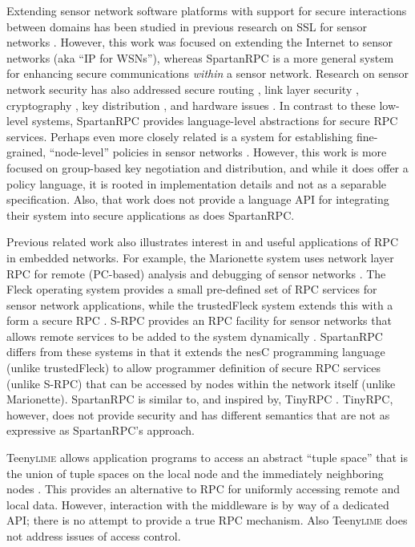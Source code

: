 
Extending sensor network software platforms with support for secure interactions between domains
has been studied in previous research on SSL for sensor networks \cite{10.1109/WAINA.2009.47}.
However, this work was focused on extending the Internet to sensor networks (aka ``IP for
WSNs''), whereas SpartanRPC is a more general system for enhancing secure communications
\emph{within} a sensor network. Research on sensor network security has also addressed secure
routing \cite{senroute-ahnj03}, link layer security \cite{karlog-tinysec-2004}, cryptography
\cite{bertoni-2006}, key distribution \cite{camtepe-bulent-05}, and hardware issues
\cite{perrig-2004}. In contrast to these low-level systems, SpartanRPC provides language-level
abstractions for secure RPC services. Perhaps even more closely related is a system for
establishing fine-grained, ``node-level'' policies in sensor networks
\cite{Claycomb:2011:NNL:1889383.1889450}. However, this work is more focused on group-based key
negotiation and distribution, and while it does offer a policy language, it is rooted in
implementation details and not as a separable specification. Also, that work does not provide a
language API for integrating their system into secure applications as does SpartanRPC.

Previous related work also illustrates interest in and useful applications of RPC in embedded
networks. For example, the Marionette system uses network layer RPC for remote (PC-based)
analysis and debugging of sensor networks \cite{whitehouse-marionette-2006}. The Fleck operating
system provides a small pre-defined set of RPC services for sensor network applications, while
the trustedFleck system extends this with a form a secure RPC
\cite{hu-secfleck-2009,Hu:2010:TTW:1806895.1806900}. S-RPC provides an RPC facility for sensor
networks that allows remote services to be added to the system dynamically \cite{5766863}.
SpartanRPC differs from these systems in that it extends the nesC programming language (unlike
trustedFleck) to allow programmer definition of secure RPC services (unlike S-RPC) that can be
accessed by nodes within the network itself (unlike Marionette). SpartanRPC is similar to, and
inspired by, TinyRPC \cite{may-tinyrpc-2007}. TinyRPC, however, does not provide security and
has different semantics that are not as expressive as SpartanRPC's approach.

Teeny\textsc{lime} allows application programs to access an abstract ``tuple space'' that is the
union of tuple spaces on the local node and the immediately neighboring nodes
\cite{Costa:2007:PWS:1516124.1516153}. This provides an alternative to RPC for uniformly
accessing remote and local data. However, interaction with the middleware is by way of a
dedicated API; there is no attempt to provide a true RPC mechanism. Also Teeny\textsc{lime} does
not address issues of access control.

